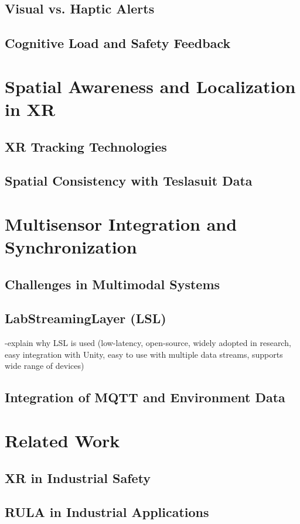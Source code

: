 \subsection{Visual vs. Haptic Alerts}

\subsection{Cognitive Load and Safety Feedback}

\section{Spatial Awareness and Localization in XR}
\subsection{XR Tracking Technologies}

\subsection{Spatial Consistency with Teslasuit Data}

\section{Multisensor Integration and Synchronization}
\subsection{Challenges in Multimodal Systems}

\subsection{LabStreamingLayer (LSL)}
-explain why LSL is used (low-latency, open-source, widely adopted in research, easy integration with Unity, easy to use with multiple data streams, supports wide range of devices)
\subsection{Integration of MQTT and Environment Data}

\section{Related Work}
\subsection{XR in Industrial Safety}
\subsection{RULA in Industrial Applications}
